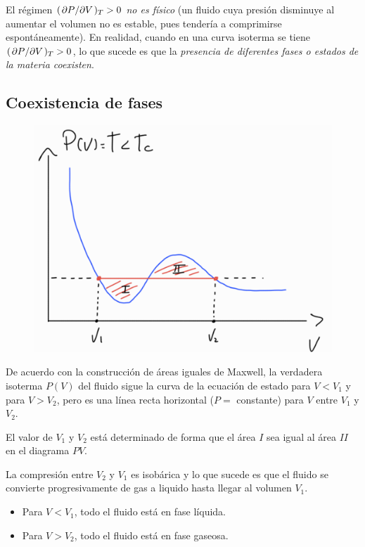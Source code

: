 El régimen $(\pdv*{P}{V})_T>0$ \textit{no es físico} (un fluido cuya presión disminuye al aumentar el volumen no es estable, pues tendería a comprimirse espontáneamente). En realidad, cuando en una curva isoterma se tiene $(\pdv*{P}{V})_T>0$, lo que sucede es que la \textit{presencia de diferentes fases o estados de la materia coexisten}.

\subsection{Coexistencia de fases}
\begin{figure}[h!]
	\centering
	\includegraphics[scale=0.4]{fig/18.png}
\end{figure}

De acuerdo con la construcción de áreas iguales de Maxwell, la verdadera isoterma $P(V)$ del fluido sigue la curva de la ecuación de estado para $V<V_1$ y para $V>V_2$, pero es una línea recta horizontal ($P=$ constante) para $V$ entre $V_1$ y $V_2$.

El valor de $V_1$ y $V_2$ está determinado de forma que el área $I$ sea igual al área $II$ en el diagrama $PV$.

La compresión entre $V_2$ y $V_1$ es isobárica y lo que sucede es que el fluido se convierte progresivamente de gas a liquido hasta llegar al volumen $V_1$.
\begin{itemize}
	\item Para $V<V_1$, todo el fluido está en fase líquida.
	\item  Para $V>V_2$, todo el fluido está en fase gaseosa.
\end{itemize}










